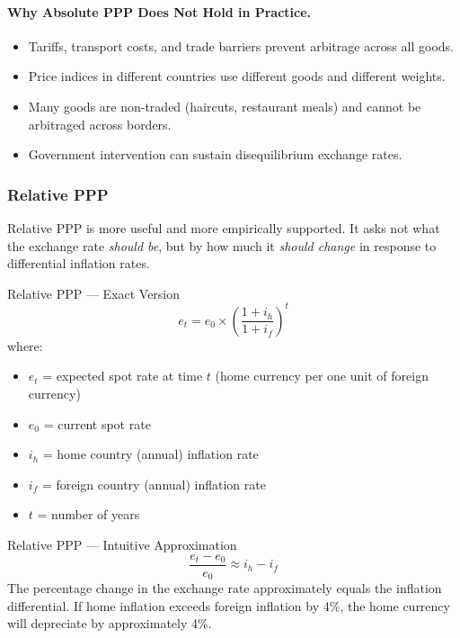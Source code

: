 \documentclass[11pt,a4paper]{article}
\begin{document}
\paragraph{Why Absolute PPP Does Not Hold in Practice.}
\begin{itemize}
  \item Tariffs, transport costs, and trade barriers prevent arbitrage across all goods.
  \item Price indices in different countries use different goods and different weights.
  \item Many goods are non-traded (haircuts, restaurant meals) and cannot be arbitraged across borders.
  \item Government intervention can sustain disequilibrium exchange rates.
\end{itemize}

\subsubsection{Relative PPP}

Relative PPP is more useful and more empirically supported. It asks not what the exchange rate \textit{should be}, but by how much it \textit{should change} in response to differential inflation rates.

\begin{formulabox}{Relative PPP --- Exact Version}
\[
  e_t = e_0 \times \left(\frac{1 + i_h}{1 + i_f}\right)^t
\]
where:
\begin{itemize}
  \item $e_t$ = expected spot rate at time $t$ (home currency per one unit of foreign currency)
  \item $e_0$ = current spot rate
  \item $i_h$ = home country (annual) inflation rate
  \item $i_f$ = foreign country (annual) inflation rate
  \item $t$ = number of years
\end{itemize}
\end{formulabox}

\begin{formulabox}{Relative PPP --- Intuitive Approximation}
\[
  \frac{e_t - e_0}{e_0} \approx i_h - i_f
\]
The percentage change in the exchange rate approximately equals the inflation differential. If home inflation exceeds foreign inflation by 4\%, the home currency will depreciate by approximately 4\%.
\end{formulabox}
\end{document}
